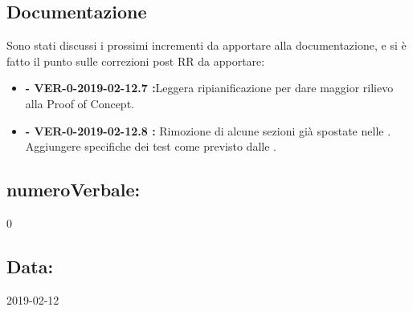 \documentclass[a4paper, oneside, openany, dvipsnames, table]{article}
\begin{document}
\subsection{Documentazione}
Sono stati discussi i prossimi incrementi da apportare alla documentazione, e si è fatto il punto sulle correzioni post RR da apportare:
\begin{itemize}
	\item \textbf{\PdP  - VER-0-2019-02-12.7 :}Leggera ripianificazione per dare maggior rilievo alla Proof of Concept.
	\item \textbf{\PdQ  - VER-0-2019-02-12.8 : }Rimozione di alcune sezioni già spostate nelle \NdP. Aggiungere specifiche dei test come previsto dalle \NdP .
\end{itemize}

\subsection{numeroVerbale:} 0

\subsection{Data:} 2019-02-12
\end{document}
